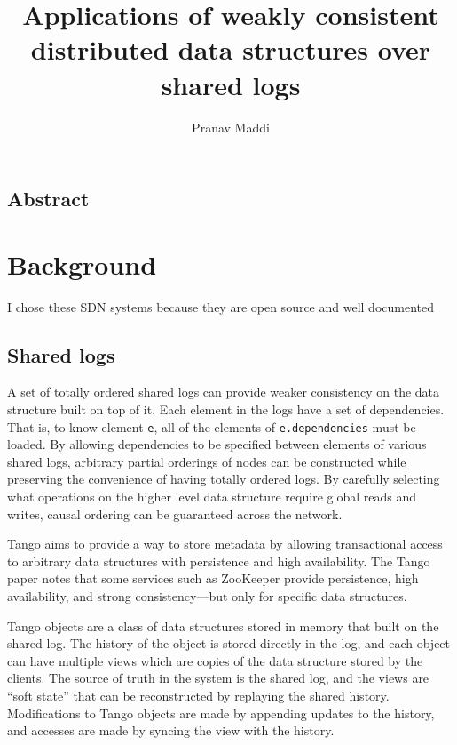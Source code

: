 \documentclass[letterpaper,twocolumn,10pt]{article}
\begin{document}
\title{\Large Applications of weakly consistent distributed data structures over shared logs}

\author{Pranav Maddi}

\date{}
\maketitle

\tableofcontents

\subsection*{Abstract}

\section{Background}

I chose these SDN systems because they are open source and well documented

\subsection{Shared logs}

A set of totally ordered shared logs can provide weaker consistency on the data structure built on top of it. Each element in the logs have a set of dependencies. That is, to know element \verb_e_, all of the elements of \verb_e.dependencies_ must be loaded.  By allowing dependencies to be specified between elements of various shared logs, arbitrary partial orderings of nodes can be constructed while preserving the convenience of having totally ordered logs. By carefully selecting what operations on the higher level data structure require global reads and writes, causal ordering can be guaranteed across the network.

Tango \cite{Tango} aims to provide a way to store metadata by allowing transactional access to arbitrary data structures with persistence and high availability. The Tango paper notes that some services such as ZooKeeper provide persistence, high availability, and strong consistency---but only for specific data structures.

Tango objects are a class of data structures stored in memory that built on the shared log. The history of the object is stored directly in the log, and each object can have multiple views which are copies of the data structure stored by the clients. The source of truth in the system is the shared log, and the views are ``soft state'' that can be reconstructed by replaying the shared history. Modifications to Tango objects are made by appending updates to the history, and accesses are made by syncing the view with the history.
\end{document}
